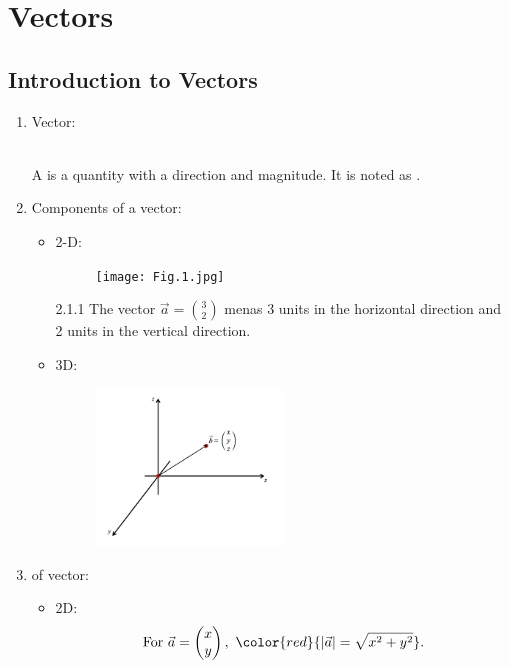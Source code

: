 \documentclass[12pt, a4paper]{article}
\begin{document}
\newpage
\section{Vectors}
\subsection{Introduction to Vectors}
\begin{enumerate}
  \item Vector: 
  \begin{myclaim}{ }{}
    \\A \textbf{\color{red}{vector}} is a quantity with a direction and magnitude. It is noted as {}.
  \end{myclaim}
  \item Components of a vector: 
  \begin{itemize}
    \item 2-D: 
    \begin{figure}[H]
      \centering
      \texttt{[image: Fig.1.jpg]}
    \end{figure}
    \begin{example}{2.1.1}{}
      The vector $\vec{a}=\binom{3}{2}$ menas 3 units in the horizontal direction and 2 units in the vertical direction.
    \end{example}
    \item 3D: 
    \begin{figure}[H]
      \centering
      \includegraphics[width=0.5\textwidth]{Fig.2.jpg}
    \end{figure}
  \end{itemize}
  \item \textbf{\color{red}{Magnitude/Modulus}} of vector: 
  \begin{itemize}
    \item 2D: $$\text{For }\vec{a}=\begin{pmatrix}x\\y\end{pmatrix},\ {\color{red}{\left|\vec{a}\right|=\sqrt{x^2+y^2}}}.$$

\end{itemize}
\end{enumerate}
\end{document}
